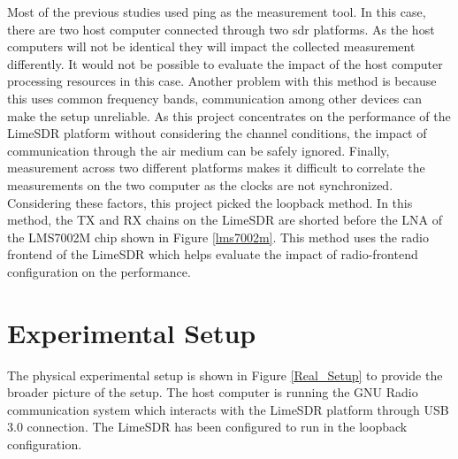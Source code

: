 Most of the previous studies used ping as the measurement tool.
In this case, there are two host computer connected through two \ac{sdr} platforms.
As the host computers will not be identical they will impact the collected measurement differently.
It would not be possible to evaluate the impact of the host computer processing resources in this case.
Another problem with this method is because this uses common frequency bands, communication among other devices can make the setup unreliable.
As this project concentrates on the performance of the LimeSDR platform without considering the channel conditions, the impact of communication through the air medium can be safely ignored.
Finally, measurement across two different platforms makes it difficult to correlate the measurements on the two computer as the clocks are not synchronized.
Considering these factors, this project picked the loopback method.
In this method, the TX and RX chains on the LimeSDR are shorted before the \ac{LNA} of the LMS7002M chip shown in Figure \ref{lms7002m}.
This method uses the radio frontend of the LimeSDR which helps evaluate the impact of radio-frontend configuration on the performance.




\section{Experimental Setup}
The physical experimental setup is shown in Figure \ref{Real_Setup} to provide the broader picture of the setup.
The host computer is running the GNU Radio communication system which interacts with the LimeSDR platform through \ac{USB} 3.0 connection.
The LimeSDR has been configured to run in the loopback configuration.\\

